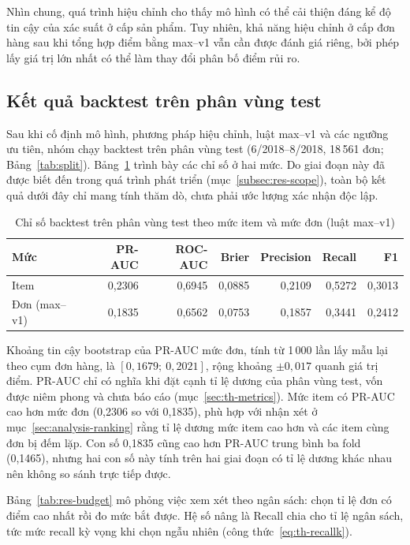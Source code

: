 \documentclass[12pt,a4paper]{report}
\begin{document}
Nhìn chung, quá trình hiệu chỉnh cho thấy mô hình có thể cải thiện đáng kể độ tin cậy của xác suất ở cấp sản phẩm. Tuy nhiên, khả năng hiệu chỉnh ở cấp đơn hàng sau khi tổng hợp điểm bằng max--v1 vẫn cần được đánh giá riêng, bởi phép lấy giá trị lớn nhất có thể làm thay đổi phân bố điểm rủi ro.

\subsection{Kết quả backtest trên phân vùng test}\label{subsec:tab-backtest}

Sau khi cố định mô hình, phương pháp hiệu chỉnh, luật max--v1 và các ngưỡng ưu tiên, nhóm chạy backtest trên phân vùng test (6/2018--8/2018, 18\,561 đơn; Bảng~\ref{tab:split}). Bảng~\ref{tab:res-backtest} trình bày các chỉ số ở hai mức. Do giai đoạn này đã được biết đến trong quá trình phát triển (mục~\ref{subsec:res-scope}), toàn bộ kết quả dưới đây chỉ mang tính thăm dò, chưa phải ước lượng xác nhận độc lập.

\begin{table}[htbp]\centering\small
\caption{Chỉ số backtest trên phân vùng test theo mức item và mức đơn (luật max--v1)}\label{tab:res-backtest}
\begin{tabular}{lrrrrrr}
\toprule
Mức & PR-AUC & ROC-AUC & Brier & Precision & Recall & F1 \\
\midrule
Item & 0,2306 & 0,6945 & 0,0885 & 0,2109 & 0,5272 & 0,3013 \\
Đơn (max--v1) & 0,1835 & 0,6562 & 0,0753 & 0,1857 & 0,3441 & 0,2412 \\
\bottomrule
\end{tabular}
\end{table}

Khoảng tin cậy bootstrap của PR-AUC mức đơn, tính từ 1\,000 lần lấy mẫu lại theo cụm đơn hàng, là $[0{,}1679;\ 0{,}2021]$, rộng khoảng $\pm 0{,}017$ quanh giá trị điểm. PR-AUC chỉ có nghĩa khi đặt cạnh tỉ lệ dương của phân vùng test, vốn được niêm phong và chưa báo cáo (mục~\ref{sec:th-metrics}). Mức item có PR-AUC cao hơn mức đơn (0,2306 so với 0,1835), phù hợp với nhận xét ở mục~\ref{sec:analysis-ranking} rằng tỉ lệ dương mức item cao hơn và các item cùng đơn bị đếm lặp. Con số 0,1835 cũng cao hơn PR-AUC trung bình ba fold (0,1465), nhưng hai con số này tính trên hai giai đoạn có tỉ lệ dương khác nhau nên không so sánh trực tiếp được.

Bảng~\ref{tab:res-budget} mô phỏng việc xem xét theo ngân sách: chọn tỉ lệ đơn có điểm cao nhất rồi đo mức bắt được. Hệ số nâng là Recall chia cho tỉ lệ ngân sách, tức mức recall kỳ vọng khi chọn ngẫu nhiên (công thức~\eqref{eq:th-recallk}).
\end{document}
